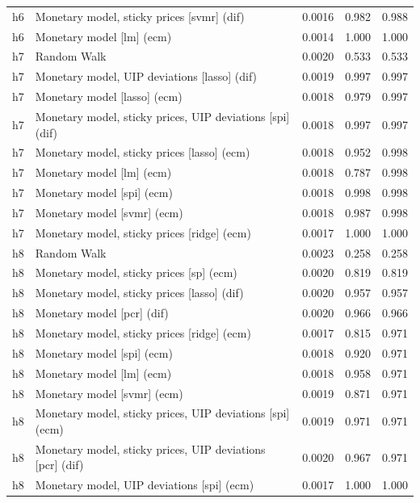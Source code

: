 \begin{ThreePartTable}
\begin{longtable}[t]{cp{5.5cm}ccc}
h6 & \raggedright Monetary model, sticky prices [svmr] (dif) & 0.0016 & 0.982 & 0.988\\
h6 & \raggedright Monetary model [lm] (ecm) & 0.0014 & 1.000 & 1.000\\
\addlinespace
h7 & \raggedright Random Walk & 0.0020 & 0.533 & 0.533\\
h7 & \raggedright Monetary model, UIP deviations [lasso] (dif) & 0.0019 & 0.997 & 0.997\\
h7 & \raggedright Monetary model [lasso] (ecm) & 0.0018 & 0.979 & 0.997\\
h7 & \raggedright Monetary model, sticky prices, UIP deviations [spi] (dif) & 0.0018 & 0.997 & 0.997\\
h7 & \raggedright Monetary model, sticky prices [lasso] (ecm) & 0.0018 & 0.952 & 0.998\\
h7 & \raggedright Monetary model [lm] (ecm) & 0.0018 & 0.787 & 0.998\\
h7 & \raggedright Monetary model [spi] (ecm) & 0.0018 & 0.998 & 0.998\\
h7 & \raggedright Monetary model [svmr] (ecm) & 0.0018 & 0.987 & 0.998\\
h7 & \raggedright Monetary model, sticky prices [ridge] (ecm) & 0.0017 & 1.000 & 1.000\\
\addlinespace
h8 & \raggedright Random Walk & 0.0023 & 0.258 & 0.258\\
h8 & \raggedright Monetary model, sticky prices [sp] (ecm) & 0.0020 & 0.819 & 0.819\\
h8 & \raggedright Monetary model, sticky prices [lasso] (dif) & 0.0020 & 0.957 & 0.957\\
h8 & \raggedright Monetary model [pcr] (dif) & 0.0020 & 0.966 & 0.966\\
h8 & \raggedright Monetary model, sticky prices [ridge] (ecm) & 0.0017 & 0.815 & 0.971\\
h8 & \raggedright Monetary model [spi] (ecm) & 0.0018 & 0.920 & 0.971\\
h8 & \raggedright Monetary model [lm] (ecm) & 0.0018 & 0.958 & 0.971\\
h8 & \raggedright Monetary model [svmr] (ecm) & 0.0019 & 0.871 & 0.971\\
h8 & \raggedright Monetary model, sticky prices, UIP deviations [spi] (ecm) & 0.0019 & 0.971 & 0.971\\
h8 & \raggedright Monetary model, sticky prices, UIP deviations [pcr] (dif) & 0.0020 & 0.967 & 0.971\\
h8 & \raggedright Monetary model, UIP deviations [spi] (ecm) & 0.0017 & 1.000 & 1.000\\

\end{longtable}
\end{ThreePartTable}
